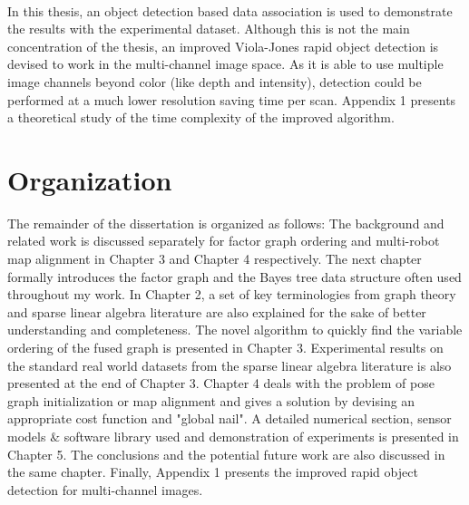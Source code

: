 \paragraph{}
In this thesis, an object detection based data association is used to demonstrate the results with the experimental dataset. Although this is not the main concentration of the thesis, an improved Viola-Jones rapid object detection \cite{violajones} is devised to work in the multi-channel image space. As it is able to use multiple image channels beyond color (like depth and intensity), detection could be performed at a much lower resolution saving time per scan. Appendix 1 presents a theoretical study of the time complexity of the improved algorithm. 

\section{Organization}
The remainder of the dissertation is organized as follows: The background and related work is discussed separately for factor graph ordering and multi-robot map alignment in Chapter 3 and Chapter 4 respectively. The next chapter formally introduces the factor graph and the Bayes tree data structure often used throughout my work. In Chapter 2, a set of key terminologies from graph theory and sparse linear algebra literature are also explained for the sake of better understanding and completeness. The novel algorithm to quickly find the variable ordering of the fused graph is presented in Chapter 3. Experimental results on the standard real world datasets from the sparse linear algebra literature is also presented at the end of Chapter 3. Chapter 4 deals with the problem of pose graph initialization or map alignment and gives a solution by devising an appropriate cost function and "global nail". A detailed numerical section, sensor models $\&$ software library used and demonstration of experiments is presented in Chapter 5. The conclusions and the potential future work are also discussed in the same chapter. Finally, Appendix 1 presents the improved rapid object detection for multi-channel images.





